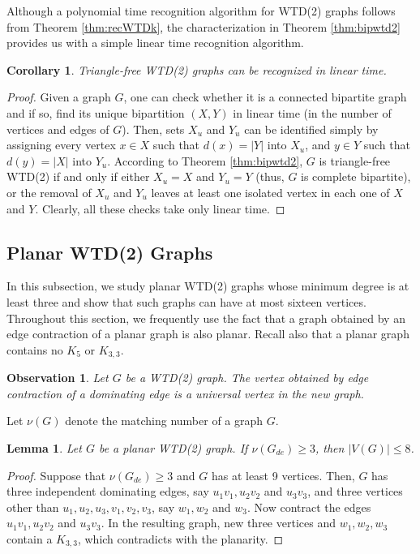 \documentclass[11pt]{article}
\newtheorem{corollary}[theorem]{Corollary}
\newtheorem{lemma}[theorem]{Lemma}
\newtheorem{observation}[theorem]{Observation}
\newtheorem{remark}[theorem]{Remark}
\theoremstyle{definition}
\begin{document}


Although a polynomial time recognition algorithm for WTD(2) graphs follows from Theorem \ref{thm:recWTDk}, the characterization in Theorem \ref{thm:bipwtd2} provides us with a simple linear time recognition algorithm.

\begin{corollary}
Triangle-free WTD(2) graphs can be recognized in linear time.
\end{corollary}
\begin{proof}
Given a graph $G$, one can check whether it is a connected bipartite graph and if so, find its unique bipartition $(X,Y)$ in linear time (in the number of vertices and edges of $G$). Then, sets $X_u$ and $Y_u$ can be identified simply by assigning every vertex $x\in X$ such that $d(x)=|Y|$ into $X_u$, and $y\in Y$ such that $d(y)=|X|$ into $Y_u$. According to Theorem  \ref{thm:bipwtd2}, $G$ is triangle-free WTD(2) if and only if either $X_u=X$ and $Y_u=Y$ (thus, $G$ is complete bipartite), or the removal of $X_u$ and $Y_u$ leaves at least one isolated vertex in each one of $X$ and $Y$. Clearly, all these checks take only linear time. 
\end{proof}


\subsection{Planar WTD(2) Graphs} \label{sec:planarWTD}
In this subsection,
we study planar WTD(2) graphs whose minimum degree is at least three
and show that such graphs can have at most sixteen vertices.
Throughout this section,
we frequently use the fact that a graph obtained by an edge contraction of a planar graph is also planar.
Recall also that a planar graph contains no $K_5$ or $K_{3,3}$.

\begin{observation}
Let $G$ be a WTD(2) graph.
The vertex obtained by edge contraction of a dominating edge is a universal vertex in the new graph.
\end{observation}


Let $\nu(G)$ denote the matching number of a graph $G$.

\begin{lemma}\label{lem:plwrd2vg8}
Let $G$ be a planar WTD(2) graph.
If $\nu(G_{de})\geq 3$, then $|V(G)|\leq 8$.
\end{lemma}
\begin{proof}
Suppose that $\nu(G_{de})\geq 3$ and $G$ has at least 9 vertices.
Then, $G$ has three independent dominating edges, say $u_1v_1,u_2v_2$ and $u_3v_3$, and three vertices other than $u_1,u_2,u_3,v_1,v_2,v_3$, say $w_1,w_2$ and $w_3$.
Now contract the edges $u_1v_1,u_2v_2$ and $u_3v_3$.
In the resulting graph, new three vertices and $w_1,w_2,w_3$ contain a $K_{3,3}$, which contradicts with the planarity.
\end{proof}
\end{document}
